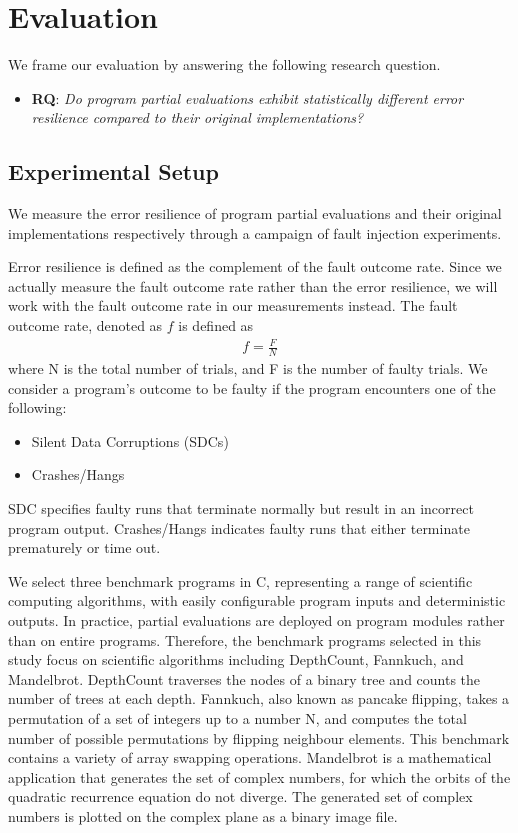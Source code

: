 \section{Evaluation}
\label{sec:evaluation}

We frame our evaluation by answering the following research question. 

\begin{itemize}
\item {\bf RQ}: \textit{Do program partial evaluations exhibit statistically different error resilience compared to their original implementations?}
\end{itemize}

\subsection{Experimental Setup}
\label{sec:exp.setup}

We measure the error resilience of program partial evaluations and their original implementations respectively through a campaign of fault injection experiments. 

Error resilience is defined as the complement of the fault outcome rate.
Since we actually measure the fault outcome rate rather than the error resilience, we will work with the fault outcome rate in our measurements instead.
The fault outcome rate, denoted as $f$ is defined as 
\begin{align*}
f = \frac{F}{N}
\end{align*}
where N is the total number of trials, and F is the number of faulty trials.
We consider a program's outcome to be faulty if the program encounters one of the following:
\begin{itemize}
\item Silent Data Corruptions (SDCs) 
\item Crashes/Hangs
\end{itemize}

SDC specifies faulty runs that terminate normally but result in an incorrect program output. 
Crashes/Hangs indicates faulty runs that either terminate prematurely or time out.

\bigbreak

We select three benchmark programs in C, representing a range of scientific computing algorithms, with easily configurable program inputs and deterministic outputs.
In practice, partial evaluations are deployed on program modules rather than on entire programs. 
Therefore, the benchmark programs selected in this study focus on scientific algorithms including DepthCount, Fannkuch, and Mandelbrot.
DepthCount traverses the nodes of a binary tree and counts the number of trees at each depth.
Fannkuch, also known as pancake flipping, takes a permutation of a set of integers up to a number N, and computes the total number of possible permutations by flipping neighbour elements.
This benchmark contains a variety of array swapping operations.
Mandelbrot is a mathematical application that generates the set of complex numbers, for which the orbits of the quadratic recurrence equation do not diverge.
The generated set of complex numbers is plotted on the complex plane as a binary image file.


